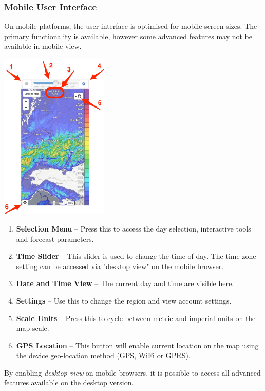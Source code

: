\documentclass[11pt,a4paper]{article}
\begin{document}
\subsubsection{Mobile User Interface}
On mobile platforms, the user interface is optimised for mobile screen sizes. The primary functionality is available, however some advanced features may not be available in mobile view.
\begin{center}
\includegraphics[height=8cm]{images/mobile_interface1.png}
\end{center}
\begin{enumerate}
\item \textbf{Selection Menu} -- Press this to access the day selection, interactive tools and forecast parameters.
\item \textbf{Time Slider} -- This slider is used to change the time of day. The time zone setting can be accessed via "desktop view" on the mobile browser.
\item \textbf{Date and Time View} -- The current day and time are visible here.
\item \textbf{Settings} -- Use this to change the region and view account settings.
\item \textbf{Scale Units} -- Press this to cycle between metric and imperial units on the map scale.
\item \textbf{GPS Location} -- This button will enable current location on the map using the device geo-location method (GPS, WiFi or GPRS).
\end{enumerate}

\begin{tip}
\item By enabling \emph{desktop view} on mobile browsers, it is possible to access all advanced features available on the desktop version.
\end{tip}
\end{document}
